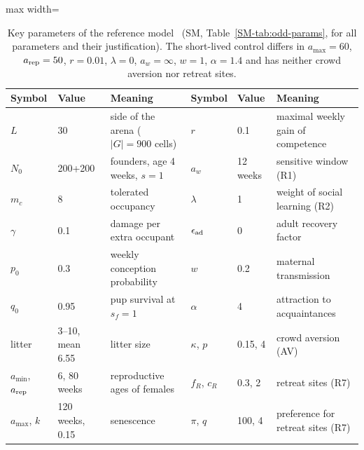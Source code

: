 \begin{table}[!tp]
\centering
\caption{Key parameters of the reference model \Cone\ (SM, Table~\ref{SM-tab:odd-params}, for all parameters and
their justification). The short-lived control differs in $a_{\max}=60$, $a_{\rm rep}=50$, $r=0.01$, $\lambda=0$,
$a_w=\infty$, $w=1$, $\alpha=1.4$ and has neither crowd aversion nor retreat sites.}
\label{tab:params}
\footnotesize
\setlength{\tabcolsep}{3pt}
\begin{adjustbox}{max width=\textwidth}
\begin{tabular}{@{}llp{4.0cm}llp{4.0cm}@{}}
\toprule
Symbol & Value & Meaning & Symbol & Value & Meaning \\
\midrule
$L$ & 30 & side of the arena ($|G|=900$ cells) & $r$ & 0.1 & maximal weekly gain of competence \\
$N_0$ & 200+200 & founders, age 4 weeks, $s=1$ & $a_w$ & 12 weeks & sensitive window (R1) \\
$m_c$ & 8 & tolerated occupancy & $\lambda$ & 1 & weight of social learning (R2) \\
$\gamma$ & 0.1 & damage per extra occupant & $\epsilon_{\rm ad}$ & 0 & adult recovery factor \\
$p_0$ & 0.3 & weekly conception probability & $w$ & 0.2 & maternal transmission \\
$q_0$ & 0.95 & pup survival at $s_f=1$ & $\alpha$ & 4 & attraction to acquaintances \\
litter & 3--10, mean 6.55 & litter size & $\kappa$, $p$ & 0.15, 4 & crowd aversion (AV) \\
$a_{\min}$, $a_{\rm rep}$ & 6, 80 weeks & reproductive ages of females & $f_R$, $c_R$ & 0.3, 2 & retreat sites (R7) \\
$a_{\max}$, $k$ & 120 weeks, 0.15 & senescence & $\pi$, $q$ & 100, 4 & preference for retreat sites (R7) \\
\bottomrule
\end{tabular}
\end{adjustbox}
\end{table}

